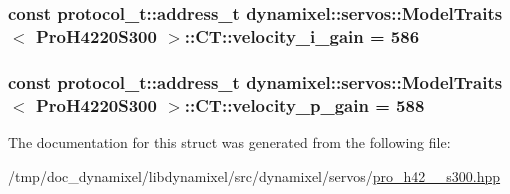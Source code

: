 \subsubsection[{velocity\+\_\+i\+\_\+gain}]{\setlength{\rightskip}{0pt plus 5cm}const {\bf protocol\+\_\+t\+::address\+\_\+t} {\bf dynamixel\+::servos\+::\+Model\+Traits}$<$ {\bf Pro\+H4220\+S300} $>$\+::C\+T\+::velocity\+\_\+i\+\_\+gain = 586\hspace{0.3cm}{\ttfamily [static]}}\label{structdynamixel_1_1servos_1_1_model_traits_3_01_pro_h4220_s300_01_4_1_1_c_t_aa5f3e06352264a1a122678121f49189c}
\hypertarget{structdynamixel_1_1servos_1_1_model_traits_3_01_pro_h4220_s300_01_4_1_1_c_t_a73974dab9abd81e1aec7c4acf1a581cb}{}
\subsubsection[{velocity\+\_\+p\+\_\+gain}]{\setlength{\rightskip}{0pt plus 5cm}const {\bf protocol\+\_\+t\+::address\+\_\+t} {\bf dynamixel\+::servos\+::\+Model\+Traits}$<$ {\bf Pro\+H4220\+S300} $>$\+::C\+T\+::velocity\+\_\+p\+\_\+gain = 588\hspace{0.3cm}{\ttfamily [static]}}\label{structdynamixel_1_1servos_1_1_model_traits_3_01_pro_h4220_s300_01_4_1_1_c_t_a73974dab9abd81e1aec7c4acf1a581cb}


The documentation for this struct was generated from the following file\+:\begin{DoxyCompactItemize}
\item 
/tmp/doc\+\_\+dynamixel/libdynamixel/src/dynamixel/servos/\hyperlink{pro__h42__20__s300_8hpp}{pro\+\_\+h42\+\_\+\_\+s300.\+hpp}\end{DoxyCompactItemize}

